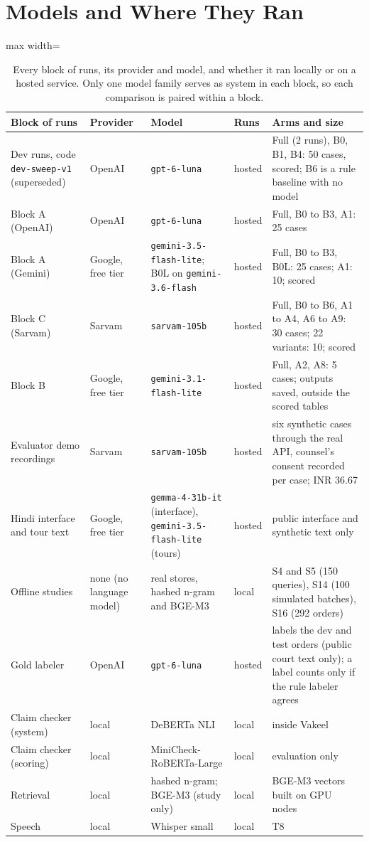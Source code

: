 \section{Models and Where They Ran}
\label{app:models}

\begin{table}[H]
\centering\small
\begin{adjustbox}{max width=\textwidth}
\begin{tabular}{@{}p{4.0cm}p{2.6cm}p{4.2cm}p{1.6cm}p{5.2cm}@{}}
\toprule
Block of runs & Provider & Model & Runs & Arms and size \\
\midrule
Dev runs, code \texttt{dev-sweep-v1} (superseded) & OpenAI & \texttt{gpt-6-luna} & hosted & Full (2 runs), B0, B1, B4: 50 cases, scored; B6 is a rule baseline with no model \\
Block A (OpenAI) & OpenAI & \texttt{gpt-6-luna} & hosted & Full, B0 to B3, A1: 25 cases \\
Block A (Gemini) & Google, free tier & \texttt{gemini-3.5-flash-lite}; B0L on \texttt{gemini-3.6-flash} & hosted & Full, B0 to B3, B0L: 25 cases; A1: 10; scored \\
Block C (Sarvam) & Sarvam & \texttt{sarvam-105b} & hosted & Full, B0 to B6, A1 to A4, A6 to A9: 30 cases; 22 variants: 10; scored \\
Block B & Google, free tier & \texttt{gemini-3.1-flash-lite} & hosted & Full, A2, A8: 5 cases; outputs saved, outside the scored tables \\
Evaluator demo recordings & Sarvam & \texttt{sarvam-105b} & hosted & six synthetic cases through the real API, counsel's consent recorded per case; INR 36.67 \\
Hindi interface and tour text & Google, free tier & \texttt{gemma-4-31b-it} (interface), \texttt{gemini-3.5-flash-lite} (tours) & hosted & public interface and synthetic text only \\
Offline studies & none (no language model) & real stores, hashed n-gram and BGE-M3 & local & S4 and S5 (150 queries), S14 (100 simulated batches), S16 (292 orders) \\
Gold labeler & OpenAI & \texttt{gpt-6-luna} & hosted & labels the dev and test orders (public court text only); a label counts only if the rule labeler agrees \\
Claim checker (system) & local & DeBERTa NLI & local & inside Vakeel \\
Claim checker (scoring) & local & MiniCheck-RoBERTa-Large & local & evaluation only \\
Retrieval & local & hashed n-gram; BGE-M3 (study only) & local & BGE-M3 vectors built on GPU nodes \\
Speech & local & Whisper small & local & T8 \\
\bottomrule
\end{tabular}
\end{adjustbox}
\caption{Every block of runs, its provider and model, and whether it ran locally or on a hosted service. Only one model family serves as system in each block, so each comparison is paired within a block.}
\label{tab:models}
\end{table}

